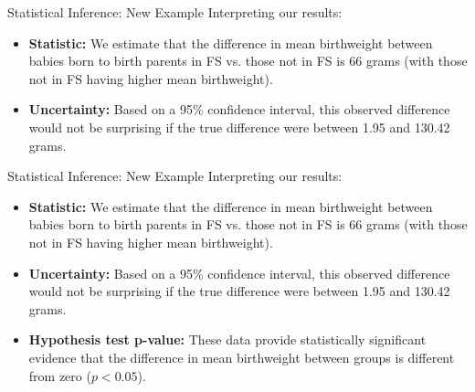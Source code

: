 \documentclass[10pt,t]{beamer}
\begin{document}
\begin{frame}{Statistical Inference: New Example}
Interpreting our results:

\vspace{0.3cm}

\begin{itemize}
	\item \textbf{Statistic:} We estimate that the difference in mean birthweight between babies born to birth parents in FS vs. those not in FS is 66 grams (with those not in FS having higher mean birthweight).
	\item \textbf{Uncertainty:} Based on a 95\% confidence interval, this observed difference would not be surprising if the true difference were between 1.95 and 130.42 grams.
\end{itemize}

\end{frame}

\begin{frame}{Statistical Inference: New Example}
Interpreting our results:

\vspace{0.3cm}

\begin{itemize}
	\item \textbf{Statistic:} We estimate that the difference in mean birthweight between babies born to birth parents in FS vs. those not in FS is 66 grams (with those not in FS having higher mean birthweight).
	\item \textbf{Uncertainty:} Based on a 95\% confidence interval, this observed difference would not be surprising if the true difference were between 1.95 and 130.42 grams.
	\item \textbf{Hypothesis test p-value:} These data provide statistically significant evidence that the difference in mean birthweight between groups is different from zero ($p < 0.05$).
\end{itemize}

\end{frame}
\end{document}
